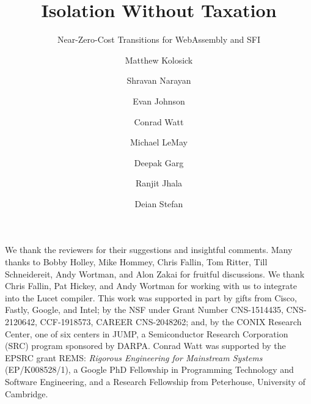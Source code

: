 \documentclass[acmsmall, screen]{acmart}
\newcommand{\iftechreport}[2]{\iftoggle{isTechReport}{#1}{#2}}
\begin{document}
\title[Isolation Without Taxation]{Isolation Without Taxation}
\subtitle{Near-Zero-Cost Transitions for WebAssembly and SFI}

\author{Matthew Kolosick}

\author{Shravan Narayan}

\author{Evan Johnson}

\author{Conrad Watt}

\author{Michael LeMay}

\author{Deepak Garg}

\author{Ranjit Jhala}

\author{Deian Stefan}



\maketitle
\renewcommand{\shortauthors}{M. Kolosick, S. Narayan, E. Johnson, C. Watt, M. LeMay, D. Garg, R. Jhala, D. Stefan}












\begin{acks}
  We thank the reviewers for their suggestions and insightful comments.
  Many thanks to Bobby Holley, Mike Hommey, Chris Fallin, Tom Ritter, Till
  Schneidereit, Andy Wortman, and Alon Zakai for fruitful discussions.
  We thank Chris Fallin, Pat Hickey, and Andy Wortman for working with us to
  integrate \verifname{} into the Lucet compiler.
  This work was supported in part by gifts from Cisco, Fastly, Google, and
  Intel; by the NSF under Grant Number CNS-1514435, CNS-2120642, CCF-1918573,
  CAREER CNS-2048262; and, by the CONIX Research Center, one of six centers in
  JUMP, a Semiconductor Research Corporation (SRC) program sponsored by DARPA.
  Conrad Watt was supported by the EPSRC grant REMS: \textit{Rigorous
  Engineering for Mainstream Systems} (EP/K008528/1), a Google PhD Fellowship in
  Programming Technology and Software Engineering, and a Research Fellowship from
  Peterhouse, University of Cambridge.
\end{acks}



\iftechreport{%
\appendix






}{}
\end{document}
